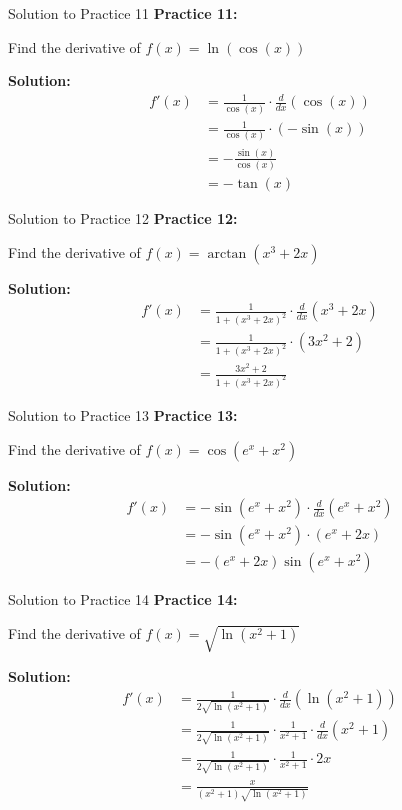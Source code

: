 \documentclass[aspectratio=169]{beamer}
\begin{document}
\begin{frame}{Solution to Practice 11}
\textbf{Practice 11:}

Find the derivative of $f(x) = \ln(\cos(x))$

\textbf{Solution:}
\[
\begin{aligned}
  f'(x) &= \frac{1}{\cos(x)} \cdot \frac{d}{dx}(\cos(x)) \\
  &= \frac{1}{\cos(x)} \cdot (-\sin(x)) \\
  &= -\frac{\sin(x)}{\cos(x)} \\
  &= -\tan(x)
\end{aligned}
\]
\end{frame}

\begin{frame}{Solution to Practice 12}
\textbf{Practice 12:}

Find the derivative of $f(x) = \arctan(x^3 + 2x)$

\textbf{Solution:}
\[
\begin{aligned}
  f'(x) &= \frac{1}{1 + (x^3 + 2x)^2} \cdot \frac{d}{dx}(x^3 + 2x) \\
  &= \frac{1}{1 + (x^3 + 2x)^2} \cdot (3x^2 + 2) \\
  &= \frac{3x^2 + 2}{1 + (x^3 + 2x)^2}
\end{aligned}
\]
\end{frame}

\begin{frame}{Solution to Practice 13}
\textbf{Practice 13:}

Find the derivative of $f(x) = \cos(e^x + x^2)$

\textbf{Solution:}
\[
\begin{aligned}
  f'(x) &= -\sin(e^x + x^2) \cdot \frac{d}{dx}(e^x + x^2) \\
  &= -\sin(e^x + x^2) \cdot (e^x + 2x) \\
  &= -(e^x + 2x)\sin(e^x + x^2)
\end{aligned}
\]
\end{frame}

\begin{frame}{Solution to Practice 14}
\textbf{Practice 14:}

Find the derivative of $f(x) = \sqrt{\ln(x^2 + 1)}$

\textbf{Solution:}
\[
\begin{aligned}
  f'(x) &= \frac{1}{2\sqrt{\ln(x^2 + 1)}} \cdot \frac{d}{dx}(\ln(x^2 + 1)) \\
  &= \frac{1}{2\sqrt{\ln(x^2 + 1)}} \cdot \frac{1}{x^2 + 1} \cdot \frac{d}{dx}(x^2 + 1) \\
  &= \frac{1}{2\sqrt{\ln(x^2 + 1)}} \cdot \frac{1}{x^2 + 1} \cdot 2x \\
  &= \frac{x}{(x^2 + 1)\sqrt{\ln(x^2 + 1)}}
\end{aligned}
\]
\end{frame}
\end{document}
